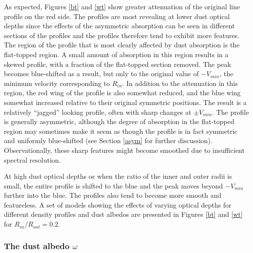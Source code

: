 \documentclass[useAMS,usenatbib,usegraphicx]{mnras}
\begin{document}
As expected, Figures \ref{bt} and \ref{wt} show greater attenuation of the original line profile on 
the red side.  The profiles are most revealing at lower 
dust optical depths since the effects of the asymmetric absorption can be seen in 
different sections of the profiles and the profiles therefore tend to exhibit more features.
  The region of the profile that is 
most clearly affected by dust absorption is the flat-topped region.  A 
small amount of absorption in this region results in a skewed profile, 
with a fraction of the flat-topped section removed.  The peak becomes 
blue-shifted as a result, but only to the original value of $-V_{min}$, the minimum 
velocity corresponding to $R_{in}$. In addition to the attenuation in this region, 
the red wing of the profile is also somewhat reduced, and the blue wing 
somewhat increased relative to their original symmetric positions.  The 
result is a relatively ``jagged'' looking profile, often with sharp changes 
at $\pm V_{min}$.  The profile is generally asymmetric, although the 
degree of absorption in the flat-topped region may sometimes make it seem 
as though the profile is in fact symmetric and uniformly blue-shifted (see 
Section \ref{asym} for further discussion).  Observationally, these sharp features might become smoothed due to insufficient spectral resolution.

At high dust optical depths or when the ratio of the inner and outer radii is small, the entire profile is shifted to the blue and the 
peak moves beyond $-V_{min}$ further into the blue.  The 
profiles also tend to become more smooth and featureless.  A set of models showing 
the effects of varying optical depths for different density profiles and 
dust albedos are presented in Figures \ref{bt} and \ref{wt} for $R_{in}/R_{out} = 0.2$.



\subsubsection{The dust albedo $\omega$}
\label{omega}
\end{document}
